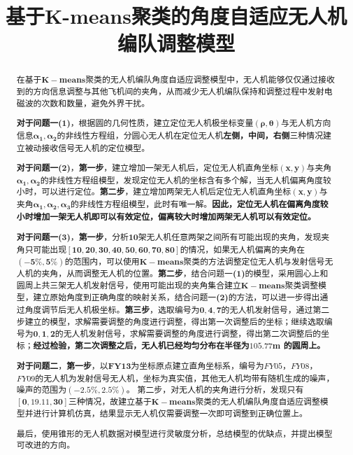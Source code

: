 \documentclass[withoutpreface,bwprint]{cumcmthesis} %
\title{基于K-means聚类的角度自适应无人机编队调整模型}
\begin{document}
	\graphicspath{{figures/}}
	\maketitle
	\begin{abstract}
	在基于$\bm{K-means}$聚类的无人机编队角度自适应调整模型中，无人机能够仅仅通过接收到的方向信息调整与其他飞机间的夹角，从而减少无人机编队保持和调整过程中发射电磁波的次数和数量，避免外界干扰。
	
	\textbf{对于问题一(1)}，根据圆的几何性质，建立定位无人机极坐标变量$\bm{(\rho,\theta)}$与无人机方向信息$\bm{\alpha_1,\alpha_2}$的非线性方程组，分圆心无人机在定位无人机\textbf{左侧，中间，右侧}三种情况建立被动接收信号无人机的定位模型。
	
	\textbf{对于问题一(2)}，\textbf{第一步}，建立增加一架无人机后，定位无人机直角坐标$\bm{(x,y)}$与夹角$\bm{\alpha_1,\alpha_2}$的非线性方程组模型，发现定位无人机的坐标含有多个解，当无人机偏离角度较小时，可以进行定位。\textbf{第二步}，建立增加两架无人机后定位无人机直角坐标$\bm{(x,y)}$与夹角$\bm{\alpha_1,\alpha_2,\alpha_3}$的非线性方程组模型，此时有唯一解。\textbf{因此，定位无人机在偏离角度较小时增加一架无人机即可以有效定位，偏离较大时增加两架无人机可以有效定位。}
	
	\textbf{对于问题一(3)}，\textbf{第一步}，分析\textbf{10}架无人机任意两架之间所有可能出现的夹角，发现夹角只可能出现$\bm{[10,20,30,40,50,60,70,80]}$的情况，如果无人机偏离的夹角在$\bm{(-5\%,5\%)}$的范围内，可以使用$\bm{K-means}$聚类的方法调整定位无人机与发射信号无人机的夹角，从而调整无人机的位置。\textbf{第二步}，结合问题一\textbf{(1)}的模型，采用圆心上和圆周上共三架无人机发射信号，使用可能出现的夹角集合建立$\bm{K-means}$聚类调整模型，建立原始角度到正确角度的映射关系，结合问题一\textbf{(2)}的方法，可以进一步得出通过角度调节后无人机极坐标。\textbf{第三步}，选取编号为$\bm{0,4,7}$的无人机发射信号，通过第二步建立的模型，求解需要调整的角度进行调整，得出第一次调整后的坐标；继续选取编号为$\bm{0,1,2}$的无人机发射信号，求解需要调整的角度进行调整，得出第二次调整后的坐标；\textbf{经过检验，第二次调整之后，无人机已经均匀分布在半径为$\bm{105.77m}$ 的圆周上。}
	
	\textbf{对于问题二}，\textbf{第一步}，以$\bm{FY13}$为坐标原点建立直角坐标系，编号为$FY05$，$FY08$，$FY09$的无人机为发射信号无人机，坐标为真实值，其他无人机均带有随机生成的噪声，噪声的范围为$\bm{(-2.5\%,2.5\%)}$。
	第二步，对无人机的夹角进行分析，发现只有$\bm{[0,19.11,30]}$三种情况，故建立基于$\bm{K-means}$聚类的无人机编队角度自适应调整模型并进行计算机仿真，结果显示无人机仅需要调整一次即可调整到正确位置上。
	
	最后，使用锥形的无人机数据对模型进行灵敏度分析，总结模型的优缺点，并提出模型可改进的方向。
	
		
	\end{abstract}
	
\end{document}
